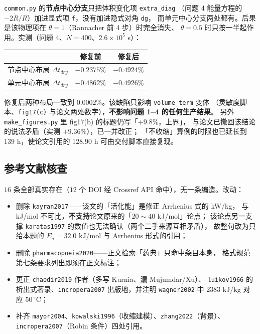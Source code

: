 \documentclass[11pt,a4paper]{ctexart}
\newcommand{\src}[1]{\texttt{#1}}
\begin{document}
\src{common.py} 的\textbf{节点中心分支}只把体积变化项 \src{extra\_diag}
（问题 4 能量方程的 $-2\dot R/R$）加进显式项 \src{f}，没有加进隐式对角 \src{dg}，
而单元中心分支两处都有。后果是该物理项在 $\theta=1$（Rannacher 前 4 步）时完全消失、
$\theta=0.5$ 时只按一半起作用。实测（问题 4、$N=400$、$2.6\times10^5$ s）：

\begin{center}
\begin{tabular}{lcc}
\toprule
& 修复前 & 修复后 \\
\midrule
节点中心布局 $\Delta t_{dry}$ & $-0.2375\%$ & $-0.4924\%$ \\
单元中心布局 $\Delta t_{dry}$ & $-0.4862\%$ & $-0.4926\%$ \\
\bottomrule
\end{tabular}
\end{center}

\noindent 修复后两种布局一致到 $0.0002\%$。该缺陷只影响 \src{volume\_term} 变体
（灵敏度脚本、\src{fig17(c)} 与论文两处数字），\textbf{不影响问题 1--4 的任何生产结果}。
另外 \src{make\_figures.py} 里 fig17(b) 的标题仍写「$+9.8\%$，上界」，
与论文已撤回该结论的说法矛盾（实测 $+9.36\%$），已一并改正；
「不收缩」算例的时限也已延长到 $139$ h，使论文引用的 $128.90$ h 可由交付脚本直接复现。

\subsection{参考文献核查}

$16$ 条全部真实存在（$12$ 个 DOI 经 Crossref API 命中），无一条编造。改动：
\begin{itemize}
  \item 删除 \src{kayran2017}——该文的「活化能」是修正 Arrhenius 式的 kW/kg，
  与 kJ/mol 不可比，\textbf{不支持}论文原来的「$20\sim40$ kJ/mol」论点；
  该论点另一支撑 \src{karatas1997} 的数值也无法确认（两个二手来源互相矛盾），
  故整句改为只给本题的 $E_a=32.0$ kJ/mol 与 Arrhenius 形式的引用；
  \item 删除 \src{pharmacopoeia2020}——正文检索「药典」只命中条目本身，
  格式规范第七条要求列出即须在正文标注；
  \item 更正 \src{chaedir2019} 作者（多写 Kurnia、漏 Mujumdar/Xu）、
  \src{luikov1966} 的析出式著录、\src{incropera2007} 出版地，并注明
  \src{wagner2002} 中 $2383$ kJ/kg 对应 $50\,^\circ$C；
  \item 补齐 \src{mayor2004}、\src{kowalski1996}（收缩建模）、\src{zhang2022}（背景）、
  \src{incropera2007}（Robin 条件）四处引用。
\end{itemize}
\end{document}
